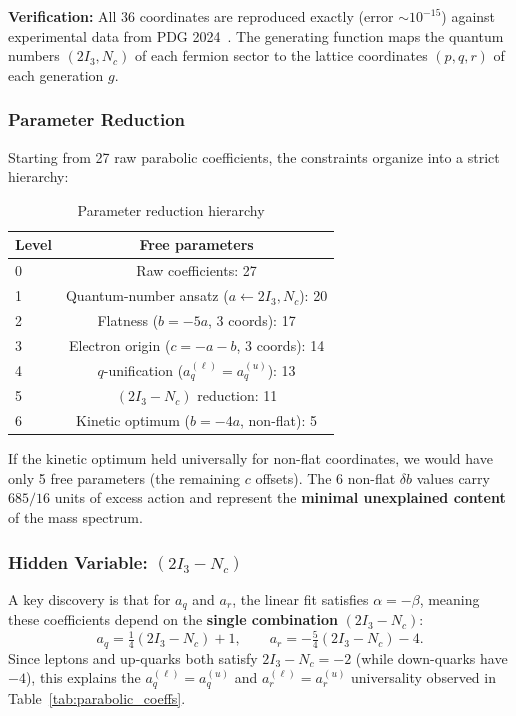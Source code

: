 \textbf{Verification:} All 36 coordinates are reproduced exactly (error $\sim 10^{-15}$) against experimental data from PDG 2024~\cite{pdg2024}. The generating function maps the quantum numbers $(2I_3, N_c)$ of each fermion sector to the lattice coordinates $(p, q, r)$ of each generation $g$.

\subsubsection{Parameter Reduction}

Starting from 27 raw parabolic coefficients, the constraints organize into a strict hierarchy:

\begin{table}[h]
\centering
\caption{Parameter reduction hierarchy}
\begin{tabular}{lc}
\hline\hline
Level & Free parameters \\
\hline
0 & Raw coefficients: 27 \\
1 & Quantum-number ansatz ($a \leftarrow 2I_3, N_c$): 20 \\
2 & Flatness ($b = -5a$, 3 coords): 17 \\
3 & Electron origin ($c = -a - b$, 3 coords): 14 \\
4 & $q$-unification ($a_q^{(\ell)} = a_q^{(u)}$): 13 \\
5 & $(2I_3 - N_c)$ reduction: 11 \\
6 & Kinetic optimum ($b = -4a$, non-flat): 5 \\
\hline
\end{tabular}
\end{table}

If the kinetic optimum held universally for non-flat coordinates, we would have only 5 free parameters (the remaining $c$ offsets). The 6 non-flat $\delta b$ values carry $685/16$ units of excess action and represent the \textbf{minimal unexplained content} of the mass spectrum.

\subsubsection{Hidden Variable: $(2I_3 - N_c)$}

A key discovery is that for $a_q$ and $a_r$, the linear fit satisfies $\alpha = -\beta$, meaning these coefficients depend on the \textbf{single combination} $(2I_3 - N_c)$:
\begin{equation}
a_q = \tfrac{1}{4}(2I_3 - N_c) + 1, \qquad
a_r = -\tfrac{5}{4}(2I_3 - N_c) - 4.
\end{equation}
Since leptons and up-quarks both satisfy $2I_3 - N_c = -2$ (while down-quarks have $-4$), this explains the $a_q^{(\ell)} = a_q^{(u)}$ and $a_r^{(\ell)} = a_r^{(u)}$ universality observed in Table~\ref{tab:parabolic_coeffs}.

